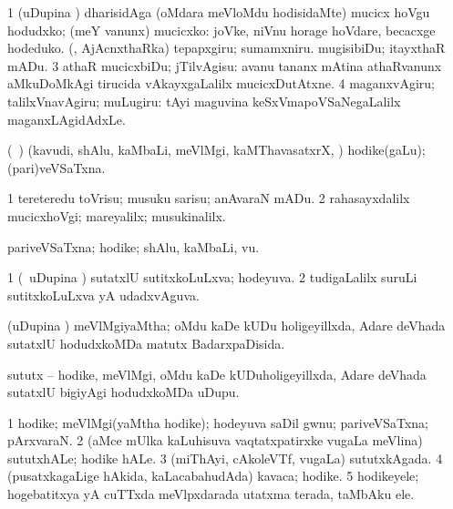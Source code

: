 {{{{{{\begin{center}
{{\noindent
\gl{\pagu}
\expl{}
\bmng
\bnum
\num{1}  (uDupina \vi) dharisidAga (oMdara meVloMdu hodisidaMte) mucicx hoVgu 
  
\banum
{} hodudxko; (meY \mo vanunx) mucicxko:  joVke, niVnu horage hoVdare, becacxge hodeduko. 
 (\ashi, AjAcnxthaRka) tepapxgiru; sumamxniru. 
 mugisibiDu; itayxthaR mADu. 
\eanum
\numie
\num{3}  athaR mucicxbiDu; jTilvAgisu:  avanu tananx mAtina athaRvanunx aMkuDoMkAgi tirucida vAkayxgaLalilx mucicxDutAtxne. 
\num{4}  maganxvAgiru; talilxVnavAgiru; muLugiru:  tAyi maguvina keSxVmapoVSaNegaLalilx maganxLAgidAdxLe. 
\enum
\emng
\eentry

\bentry
{} 
\gl{\nA}
\expl{}
\bmng
(\sA\ \bava) (kavudi, shAlu, kaMbaLi, meVlMgi, kaMThavasatxrX, \mo) hodike(gaLu); (pari)veVSaTxna. 
\emng

\noindent
\gl{\pagu}
\expl{}
\bmng
\bnum
\num{1}  tereteredu toVrisu; musuku sarisu; anAvaraN mADu. 
\num{2}  rahasayxdalilx mucicxhoVgi; mareyalilx; musukinalilx. 
\enum
\emng
\eentry

\bentry 
{} 
\gl{\nA}
\expl{}
\bmng
pariveVSaTxna; hodike; shAlu, kaMbaLi, \mo vu. 
\emng
\eentry

\bentry 
{} 
\gl{\gu}
\expl{}
\bmng
\bnum
\num{1} (\kanmu\ uDupina \vi) sutatxlU sutitxkoLuLxva; hodeyuva. 
\num{2} tudigaLalilx suruLi sutitxkoLuLxva yA udadxvAguva. 
\enum
\emng
\eentry

\bentry
{} 
\gl{\gu}
\expl{}
\bmng
(uDupina \vi) meVlMgiyaMtha; oMdu kaDe kUDu holigeyillxda, Adare deVhada sutatxlU hodudxkoMDa matutx BadarxpaDisida. 
\emng
\eentry

\bentry
{} 
\gl{\nA}
\expl{}
\bmng
sututx -- hodike, meVlMgi, oMdu kaDe kUDuholigeyillxda, Adare deVhada sutatxlU bigiyAgi hodudxkoMDa uDupu. 
\emng
\eentry

\bentry
{} 
\gl{\nA}
\expl{}
\bmng
{} 
\emng
\eentry

\bentry
{} 
\gl{\nA}
\expl{}
\bmng
\bnum
\num{1} hodike; meVlMgi(yaMtha hodike); hodeyuva saDil gwnu; pariveVSaTxna; pArxvaraN. 
\num{2} (aMce mUlka kaLuhisuva vaqtatxpatirxke \mo vugaLa meVlina) sututxhALe; hodike hALe. 
\num{3} (miThAyi, cAkoleVTf, \mo vugaLa) sututxkAgada. 
\num{4} (pusatxkagaLige hAkida, kaLacabahudAda) kavaca; hodike. 
\num{5} hodikeyele; hogebatitxya yA cuTTxda meVlpxdarada utatxma terada, taMbAku ele. 
\enum
\emng
\eentry

}}
\end{center}}}}}}}
